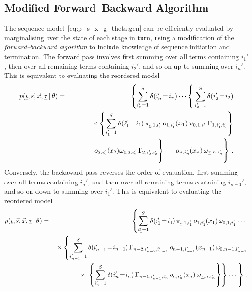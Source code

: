 \documentclass[a4paper]{article}
\begin{document}
\subsection{Modified Forward--Backward Algorithm}\label{sec:forward-backward}

The sequence model~\eqref{eq:p_s_x_g_theta:gen} can be efficiently evaluated by marginalising over the state of each stage
in turn, using a modification of the {\em forward--backward algorithm} to include knowledge of
sequence initiation and termination.
 The forward pass involves first summing over all terms containing $i_1'$, then over all remaining terms containing $i_2'$,
and so on up to summing over $i_n'$. This is equivalent to evaluating the reordered model
\begin{eqnarray}
   p(\underline{\iota},\vec{s},\vec{x},\underline{\tau}\,|\,\theta) 
& = & 
   \left\{\sum_{i_n'=1}^{S}\delta(i_n'\!=\!i_n)
\cdots
\right\{\sum_{i_2'=1}^{S}\delta(i_2'\!=\!i_2)
\nonumber\\&&
\hspace*{10mm}{}\times
\left\{\sum_{i_1'=1}^{S}\delta(i_1'\!=\!i_1)\,
\pi_{\underline{\iota},1,i_1'}\,o_{1,i_1'}(x_1)\,\omega_{0,1,i_1'}\,\Gamma_{1,i_1',i_{2}'}\right\}
\nonumber\\&&
\left.\rule{0pt}{7mm}
o_{2,i_{2}'}(x_{2})\omega_{0,2,i_{2}'}\,\Gamma_{2,i_{2}',i_{3}'}\right\}
\cdots
\left.\rule{0pt}{7mm}\,o_{n,i_{n}'}(x_{n})
\,\omega_{\underline{\tau},n,i_n'}\right\}
\,.
\label{eq:forward}
\end{eqnarray}
Conversely, the backaward pass reverses the order of evaluation, first summing over all terms containing $i_n'$,
and then over all remaining terms containing $i_{n-1}'$, and so on down to summing over $i_1'$.
This is equivalent to evaluating the reordered model
\begin{eqnarray}
   p(\underline{\iota},\vec{s},\vec{x},\underline{\tau}\,|\,\theta) 
& = & 
   \left\{\sum_{i_1'=1}^{S}\delta(i_1'\!=\!i_1)\,
\pi_{\underline{\iota},1,i_1'}\,o_{1,i_1'}(x_1)\,\omega_{0,1,i'_{1}}\,
\cdots\right.
\nonumber\\&&
{}\times\left\{\sum_{i_{n-1}'=1}^{S}\delta(i_{n-1}'\!=\!i_{n-1})\,
\Gamma_{n-2,i_{n-2}',i_{n-1}'}\,o_{n-1,i_{n-1}'}(x_{n-1})\,\omega_{0,n-1,i'_{n-1}}\right.
\nonumber\\&&
\hspace*{4mm}{}\times
\left.\rule{0pt}{7mm}\left\{\sum_{i_n'=1}^{S}\delta(i_n'\!=\!i_n)\,
\Gamma_{n-1,i_{n-1}',i_{n}'}\,o_{n,i_{n}'}(x_{n})
\,\omega_{\underline{\tau},n,i_n'}\right\}\right\}
\cdots\left.\rule{0pt}{7mm}\right\}
\,.
\label{eq:backward}
\end{eqnarray}
\end{document}
